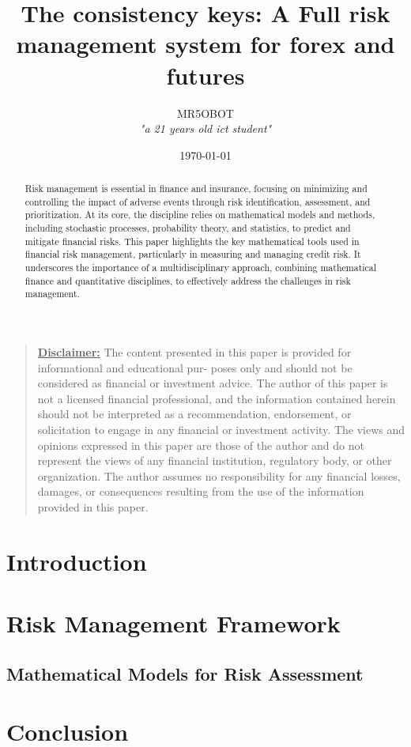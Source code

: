 \documentclass[11pt]{article}
\begin{document}
\title{The consistency keys: A Full risk management system for forex and futures}
\author{MR5OBOT \\ \textit{"a 21 years old ict student"}}
\date{\today}
\maketitle
\tableofcontents

\begin{abstract}
\noindent Risk management is essential in finance and insurance, focusing on minimizing and controlling the impact of adverse events through risk identification, assessment, and prioritization. At its core, the discipline relies on mathematical models and methods, including stochastic processes, probability theory, and statistics, to predict and mitigate financial risks. This paper highlights the key mathematical tools used in financial risk management, particularly in measuring and managing credit risk. It underscores the importance of a multidisciplinary approach, combining mathematical finance and quantitative disciplines, to effectively address the challenges in risk management.
\end{abstract}

\begin{quote}
{\scriptsize
\noindent 
\textbf{\underline{Disclaimer:}} The content presented in this paper is provided for informational and educational pur-
poses only and should not be considered as financial or investment advice. The author of this paper is
not a licensed financial professional, and the information contained herein should not be interpreted as
a recommendation, endorsement, or solicitation to engage in any financial or investment activity. The
views and opinions expressed in this paper are those of the author and do not represent the views of
any financial institution, regulatory body, or other organization. The author assumes no responsibility
for any financial losses, damages, or consequences resulting from the use of the information provided
in this paper.
}
\end{quote}
\newpage

\section{Introduction}

\newpage

\section{Risk Management Framework}

\newpage

\subsection{Mathematical Models for Risk Assessment}

\newpage
  \begin{center}
  \end{center}


\section{Conclusion}
\end{document}
